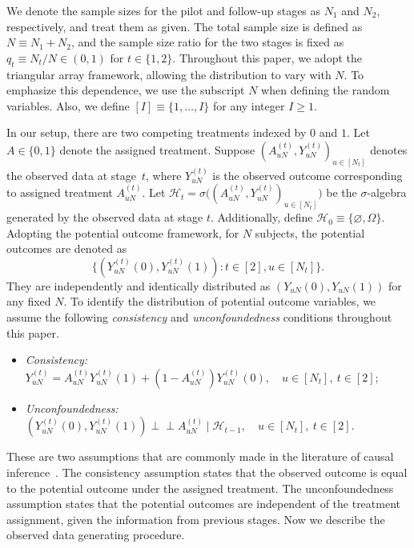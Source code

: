 \documentclass[12pt]{article}
\newcommand{\indep}{\perp \!\!\! \perp}
\begin{document}
We denote the sample sizes for the pilot and follow-up stages as \( N_1 \) and \( N_2 \), respectively, and treat them as given. The total sample size is defined as \( N \equiv N_1 + N_2 \), and the sample size ratio for the two stages is fixed as \( q_t \equiv N_t / N \in (0, 1) \) for \( t \in \{1, 2\} \). Throughout this paper, we adopt the triangular array framework, allowing the distribution to vary with \( N \). To emphasize this dependence, we use the subscript \( N \) when defining the random variables. Also, we define \([I] \equiv \{1, \ldots, I\}\) for any integer \(I \geq 1\). 

In our setup, there are two competing treatments indexed by \( 0 \) and \( 1 \). Let \( A \in \{0,1\} \) denote the assigned treatment. Suppose $(A_{uN}^{(t)}, Y_{uN}^{(t)})_{u \in [N_t]}$ denotes the observed data at stage~$t$, where $Y_{uN}^{(t)}$ is the observed outcome corresponding to assigned treatment $A_{uN}^{(t)}$. Let $\mathcal{H}_t = \sigma\big((A_{uN}^{(t)}, Y_{uN}^{(t)})_{u \in [N_t]}\big)$ be the $\sigma$-algebra generated by the observed data at stage $t$. Additionally, define \(\mathcal{H}_0 \equiv  \{\varnothing, \Omega\}\). Adopting the potential outcome framework, for \( N \) subjects, 
the potential outcomes are denoted as 
\[
\{(Y_{uN}^{(t)}(0), Y_{uN}^{(t)}(1)) : t \in [2], u \in [N_t]\}.
\]
They are independently and identically distributed as \( (Y_{uN}(0), Y_{uN}(1)) \) for any fixed \( N \). To identify the distribution of potential outcome variables, we assume the following \textit{consistency} and \textit{unconfoundedness} conditions throughout this paper. 
\begin{itemize}
    \item \emph{Consistency:}
    $Y_{uN}^{(t)} = A_{uN}^{(t)}Y_{uN}^{(t)}(1) + (1 - A_{uN}^{(t)})Y_{uN}^{(t)}(0), \quad u \in [N_t], \ t \in [2]$;
    \item \emph{Unconfoundedness:} 
    $(Y_{uN}^{(t)}(0), Y_{uN}^{(t)}(1)) \indep A_{uN}^{(t)} \mid \mathcal{H}_{t-1}, \quad u \in [N_t], \ t \in [2]$.
\end{itemize}
These are two assumptions that are commonly made in the literature of causal inference~\citep{imbens2015causal}. The consistency assumption states that the observed outcome is equal to the potential outcome under the assigned treatment. The unconfoundedness assumption states that the potential outcomes are independent of the treatment assignment, given the information from previous stages. Now we describe the observed data generating procedure. 
\end{document}
